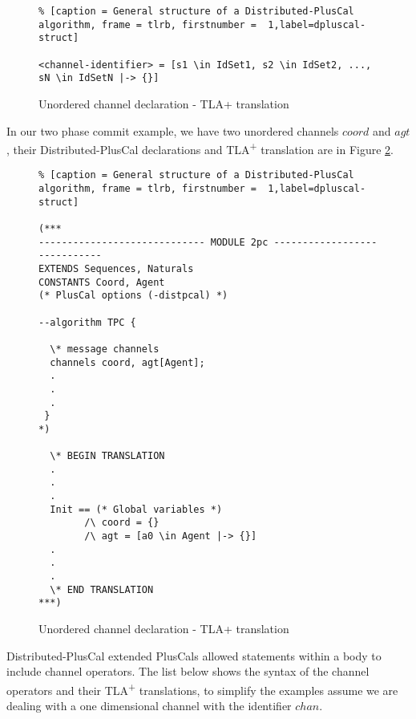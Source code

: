 \documentclass{thesul}
\newcommand{\tlaplus}{TLA\textsuperscript{+}\xspace}
\begin{document}
\FloatBarrier
\begin{figure}[!h]
\begin{lstlisting}% [caption = General structure of a Distributed-PlusCal algorithm, frame = tlrb, firstnumber =  1,label=dpluscal-struct]

<channel-identifier> = [s1 \in IdSet1, s2 \in IdSet2, ..., sN \in IdSetN |-> {}]

\end{lstlisting}
\caption{Unordered channel declaration - TLA+ translation}
\label{unorderedtla}
\end{figure}
\FloatBarrier


In our two phase commit example, we have two unordered channels $coord$ and $agt$, their Distributed-PlusCal declarations and \tlaplus translation are in Figure \ref{2pcchannels}.

\FloatBarrier
\begin{figure}[!h]
\begin{lstlisting}% [caption = General structure of a Distributed-PlusCal algorithm, frame = tlrb, firstnumber =  1,label=dpluscal-struct]

(***
----------------------------- MODULE 2pc -----------------------------
EXTENDS Sequences, Naturals
CONSTANTS Coord, Agent
(* PlusCal options (-distpcal) *)
  
--algorithm TPC { 

  \* message channels
  channels coord, agt[Agent];
  .
  .
  .
 }
*)
  
  \* BEGIN TRANSLATION 
  .
  .
  .
  Init == (* Global variables *)
        /\ coord = {}
        /\ agt = [a0 \in Agent |-> {}]
  .
  .
  .      
  \* END TRANSLATION 
***)

\end{lstlisting}
\caption{Unordered channel declaration - TLA+ translation}
\label{2pcchannels}
\end{figure}
\FloatBarrier

Distributed-PlusCal extended PlusCals allowed statements within a body to include channel operators.
The list below shows the syntax of the channel operators and their \tlaplus translations, to simplify the examples assume we are dealing with a one dimensional channel with the identifier $chan$.
\end{document}
